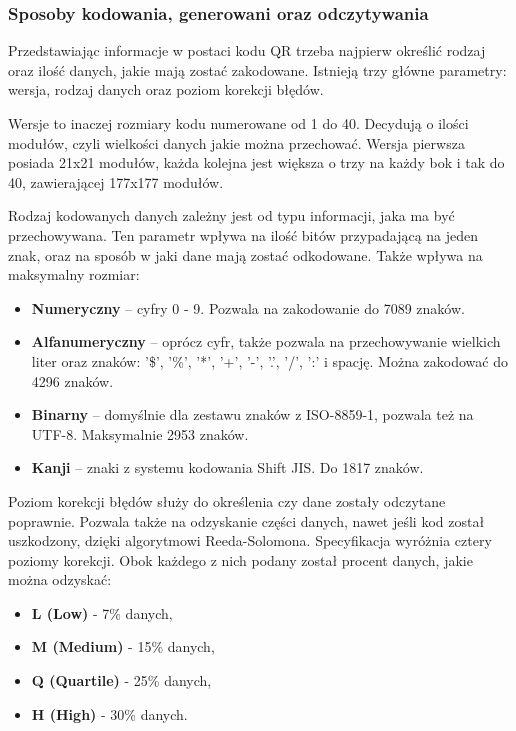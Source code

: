 \subsubsection*{Sposoby kodowania, generowani oraz odczytywania}
Przedstawiając informacje w postaci kodu QR trzeba najpierw określić rodzaj oraz ilość danych, jakie mają zostać zakodowane. Istnieją trzy główne parametry: wersja, rodzaj danych oraz poziom korekcji błędów.

Wersje to inaczej rozmiary kodu numerowane od 1 do 40. Decydują o ilości modułów, czyli wielkości danych jakie można przechować. Wersja pierwsza posiada 21x21 modułów, każda kolejna jest większa o trzy na każdy bok i tak do 40, zawierającej 177x177 modułów. 

Rodzaj kodowanych danych zależny jest od typu informacji, jaka ma być przechowywana. Ten parametr wpływa na ilość bitów przypadającą na jeden znak, oraz na sposób w jaki dane mają zostać odkodowane.  Także wpływa na maksymalny rozmiar:
\begin{itemize}
	\item \textbf{Numeryczny} -- cyfry 0 - 9. Pozwala na zakodowanie do 7089 znaków.
	\item \textbf{Alfanumeryczny} -- oprócz cyfr, także pozwala na przechowywanie wielkich liter oraz znaków: '\$', '\%', '*', '+', '-', '.', '/', ':' i spację. Można zakodować do 4296 znaków. 
	\item \textbf{Binarny} -- domyślnie dla zestawu znaków z ISO-8859-1, pozwala też na UTF-8. Maksymalnie 2953 znaków.
	\item \textbf{Kanji} -- znaki z systemu kodowania Shift JIS. Do 1817 znaków.
\end{itemize}

Poziom korekcji błędów służy do określenia czy dane zostały odczytane poprawnie. Pozwala także na odzyskanie części danych, nawet jeśli kod został uszkodzony, dzięki algorytmowi Reeda-Solomona. Specyfikacja wyróżnia cztery poziomy korekcji. Obok każdego z nich podany został procent danych, jakie można odzyskać:
\begin{itemize}
	\item \textbf{L (Low)} - 7\% danych,
	\item \textbf{M (Medium)} - 15\% danych,
	\item \textbf{Q (Quartile)} - 25\% danych,
	\item \textbf{H (High)} - 30\% danych.
\end{itemize}

